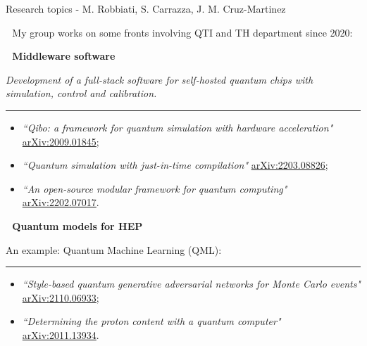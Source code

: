 \documentclass[9pt, xcolor={svgnames}, hyperref={colorlinks,linkcolor=black, citecolor=teal, urlcolor=teal}]{beamer}
\date{\today}
\newcommand*{\xdash}[1][3em]{\rule[0.5ex]{#1}{0.55pt}}
\begin{document}
\begin{frame}{\normalsize Research topics - M. Robbiati, S. Carrazza, J. M. Cruz-Martinez}

\vspace{0.1cm}

\faGroup\,\, My group  works on some fronts involving QTI and TH department since 2020:

    \begin{multicols}{2}
    
    \begin{tcolorbox}[colback=blue!20,boxrule=1pt,arc=.8em,boxsep=-1mm]
    \faCode\,\, \textbf{Middleware software}
    \vspace{0.15cm}

    \small
    \textit{Development of a full-stack software for self-hosted quantum chips with simulation, control and calibration.}

    \xdash[17em]

    \begin{itemize}
        \item[\faEdit] \textit{``Qibo: a framework for quantum simulation with hardware acceleration"} \href{https://arxiv.org/abs/2009.01845}{arXiv:2009.01845};
        
        \item[\faEdit] \textit{``Quantum simulation with just-in-time compilation"} \href{https://arxiv.org/abs/2203.08826}{	arXiv:2203.08826};
        
        \item[\faEdit] \textit{``An open-source modular framework for quantum computing"} \href{https://arxiv.org/abs/2202.07017}{	arXiv:2202.07017}.
    \end{itemize}
    \end{tcolorbox}

    \begin{tcolorbox}[colback=teal!20,boxrule=1pt,arc=.8em,boxsep=-0.5mm]
    \faBarChart\,\, \textbf{Quantum models for HEP}
    \vspace{0.15cm}
    
    \small
    
    An example: Quantum Machine Learning (QML):

    \vspace{0.25cm}

    
    \xdash[17em]
    
    \begin{itemize}
        \item[\faEdit] \textit{``Style-based quantum generative adversarial networks for Monte Carlo events"} \href{https://arxiv.org/abs/2110.06933}{arXiv:2110.06933};
        \item[\faEdit] \textit{``Determining the proton content with a quantum computer"} \href{https://arxiv.org/abs/2011.13934}{arXiv:2011.13934}.
    \end{itemize}
    \end{tcolorbox}
    \end{multicols}


\end{frame}
\end{document}
